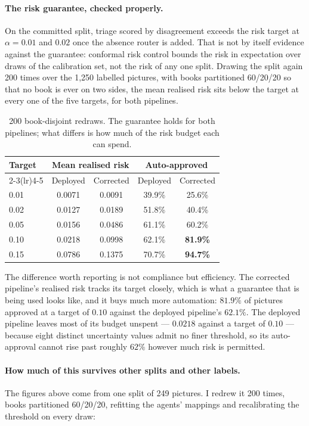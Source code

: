 \documentclass[11pt,a4paper]{article}
\begin{document}
\paragraph{The risk guarantee, checked properly.} On the committed split, triage scored by disagreement
exceeds the risk target at $\alpha = 0.01$ and $0.02$ once the absence router is added. That is not by itself evidence against the
guarantee: conformal risk control bounds the risk in expectation over draws of the calibration set,
not the risk of any one split. Drawing the split again 200 times over the 1,250 labelled pictures,
with books partitioned 60/20/20 so that no book is ever on two sides, the mean realised risk sits
below the target at every one of the five targets, for both pipelines.

\begin{table}[h]
\centering
\small
\begin{tabular}{lcccc}
\toprule
Target & \multicolumn{2}{c}{Mean realised risk} & \multicolumn{2}{c}{Auto-approved} \\
\cmidrule(lr){2-3}\cmidrule(lr){4-5}
 & Deployed & Corrected & Deployed & Corrected \\
\midrule
0.01 & 0.0071 & 0.0091 & 39.9\% & 25.6\% \\
0.02 & 0.0127 & 0.0189 & 51.8\% & 40.4\% \\
0.05 & 0.0156 & 0.0486 & 61.1\% & 60.2\% \\
0.10 & 0.0218 & 0.0998 & 62.1\% & \textbf{81.9\%} \\
0.15 & 0.0786 & 0.1375 & 70.7\% & \textbf{94.7\%} \\
\bottomrule
\end{tabular}
\caption{200 book-disjoint redraws. The guarantee holds for both pipelines; what differs is how much
of the risk budget each can spend.}
\end{table}

The difference worth reporting is not compliance but efficiency. The corrected pipeline's realised
risk tracks its target closely, which is what a guarantee that is being used looks like, and it buys
much more automation: $81.9\%$ of pictures approved at a target of $0.10$ against the deployed
pipeline's $62.1\%$. The deployed pipeline leaves most of its budget unspent --- $0.0218$ against a
target of $0.10$ --- because eight distinct uncertainty values admit no finer threshold, so its
auto-approval cannot rise past roughly $62\%$ however much risk is permitted.

\paragraph{How much of this survives other splits and other labels.} The figures above come from
one split of 249 pictures. I redrew it 200 times, books partitioned 60/20/20, refitting the agents'
mappings and recalibrating the threshold on every draw:
\end{document}
